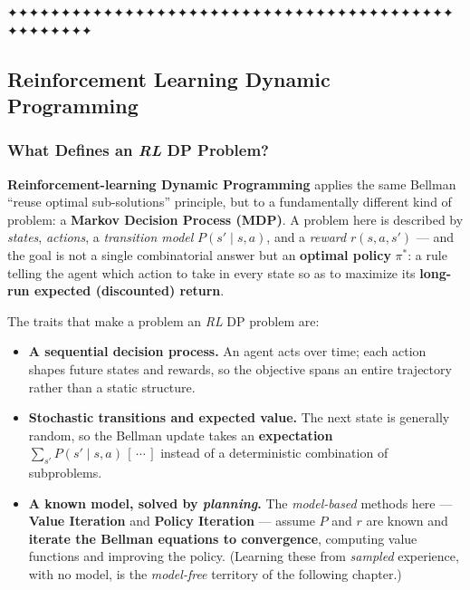 \documentclass[11pt]{article}
\providecommand{\tightlist}{%
      \setlength{\itemsep}{0pt}\setlength{\parskip}{0pt}}
\begin{document}
    ✦✦✦✦✦✦✦✦✦✦✦✦✦✦✦✦✦✦✦✦✦✦✦✦✦✦✦✦✦✦✦✦✦✦✦✦✦✦✦✦✦✦✦✦✦✦✦✦✦✦

    \clearpage

\subsection{Reinforcement Learning Dynamic
Programming}\label{reinforcement-learning-dynamic-programming}

\label{rl-dp-intro}

\subsubsection{\texorpdfstring{What Defines an \emph{RL} DP
Problem?}{What Defines an RL DP Problem?}}\label{what-defines-an-rl-dp-problem}

\textbf{Reinforcement-learning Dynamic Programming} applies the same
Bellman ``reuse optimal sub-solutions'' principle, but to a
fundamentally different kind of problem: a \textbf{Markov Decision
Process (MDP)}. A problem here is described by \emph{states},
\emph{actions}, a \emph{transition model} \(P(s'\mid s,a)\), and a
\emph{reward} \(r(s,a,s')\) --- and the goal is not a single
combinatorial answer but an \textbf{optimal policy} \(\pi^{*}\): a rule
telling the agent which action to take in every state so as to maximize
its \textbf{long-run expected (discounted) return}.

The traits that make a problem an \emph{RL} DP problem are:

\begin{itemize}
\tightlist
\item
  \textbf{A sequential decision process.} An agent acts over time; each
  action shapes future states and rewards, so the objective spans an
  entire trajectory rather than a static structure.
\item
  \textbf{Stochastic transitions and expected value.} The next state is
  generally random, so the Bellman update takes an \textbf{expectation}
  \(\sum_{s'} P(s'\mid s,a)\,[\,\cdots\,]\) instead of a deterministic
  combination of subproblems.
\item
  \textbf{A known model, solved by \emph{planning}.} The
  \emph{model-based} methods here --- \textbf{Value Iteration} and
  \textbf{Policy Iteration} --- assume \(P\) and \(r\) are known and
  \textbf{iterate the Bellman equations to convergence}, computing value
  functions and improving the policy. (Learning these from
  \emph{sampled} experience, with no model, is the \emph{model-free}
  territory of the following chapter.)
\end{itemize}
\end{document}
